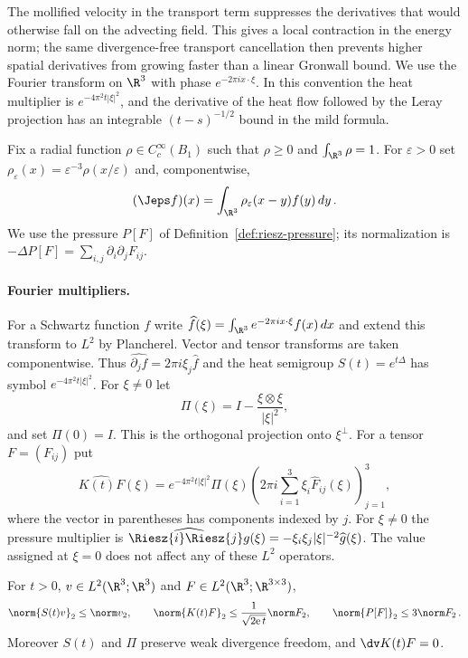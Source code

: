 \documentclass[11pt,reqno]{amsart}
\begin{document}
The mollified velocity in the transport term suppresses the derivatives that
would otherwise fall on the advecting field. This gives a local contraction
in the energy norm; the same divergence-free transport cancellation then
prevents higher spatial derivatives from growing faster than a linear
Gronwall bound. We use the Fourier transform on $\R^3$ with phase
$e^{-2\pi i x\cdot\xi}$. In this convention the heat multiplier is
$e^{-4\pi^2t|\xi|^2}$, and the derivative of the heat flow followed by the
Leray projection has an integrable $(t-s)^{-1/2}$ bound in the mild formula.

Fix a radial function $\rho\in C_c^\infty(B_1)$ such that $\rho\ge0$ and
$\int_{\R^3}\rho=1$. For $\varepsilon>0$ set
$\rho_\varepsilon(x)=\varepsilon^{-3}\rho(x/\varepsilon)$ and, componentwise,
\begin{equation}\label{eq:reg-mollifier}
  (\Jeps f)(x)=\int_{\R^3}\rho_\varepsilon(x-y)f(y)\,dy\,.
\end{equation}
We use the pressure $P[F]$ of Definition~\ref{def:riesz-pressure}; its
normalization is $-\Delta P[F]=\sum_{i,j}\partial_i\partial_jF_{ij}$.

\paragraph{Fourier multipliers.}
For a Schwartz function $f$ write
$\widehat f(\xi)=\int_{\R^3}e^{-2\pi i x\cdot\xi}f(x)\,dx$ and extend this
transform to $L^2$ by Plancherel. Vector and tensor transforms are taken
componentwise. Thus $\widehat{\partial_j f}=2\pi i\xi_j\widehat f$ and the
heat semigroup $S(t)=e^{t\Delta}$ has symbol $e^{-4\pi^2t|\xi|^2}$. For
$\xi\ne0$ let
\begin{equation}\label{eq:reg-leray-symbol}
  \Pi(\xi)=I-\frac{\xi\otimes\xi}{|\xi|^2},
\end{equation}
and set $\Pi(0)=I$. This is the orthogonal projection onto $\xi^\perp$.
For a tensor $F=(F_{ij})$ put
\begin{equation}\label{eq:reg-stokes-multiplier}
  \widehat{K(t)F}(\xi)=e^{-4\pi^2t|\xi|^2}\Pi(\xi)
    \left(2\pi i\sum_{i=1}^3\xi_i\widehat F_{ij}(\xi)\right)_{j=1}^3,
\end{equation}
where the vector in parentheses has components indexed by $j$. For
$\xi\ne0$ the pressure multiplier is
$\widehat{\Riesz{i}\Riesz{j}g}(\xi)=-\xi_i\xi_j|\xi|^{-2}\widehat g(\xi)$.
The value assigned at $\xi=0$ does not affect any of these $L^2$ operators.

\begin{lemma}\label{lem:reg-multiplier-bounds}
For $t>0$, $v\in L^2(\R^3;\R^3)$ and $F\in L^2(\R^3;\R^{3\times3})$,
\begin{equation}\label{eq:reg-multiplier-bounds}
  \norm{S(t)v}_2\le\norm v_2,\qquad
  \norm{K(t)F}_2\le\frac{1}{\sqrt{2\mathrm e\,t}}\norm F_2,\qquad
  \norm{P[F]}_2\le 3\norm F_2\,.
\end{equation}
Moreover $S(t)$ and $\Pi$ preserve weak divergence freedom, and
$\dv K(t)F=0$.
\end{lemma}
\end{document}
